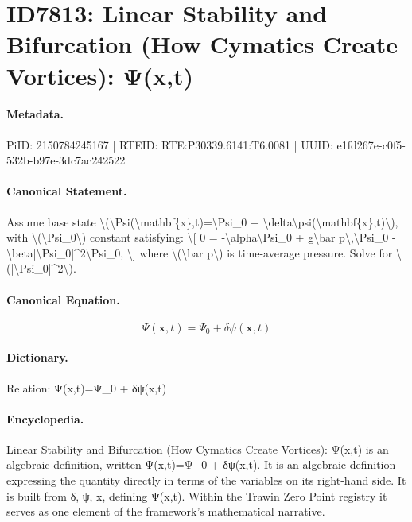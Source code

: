 \section*{ID7813: Linear Stability and Bifurcation (How Cymatics Create Vortices): Ψ(x,t)}
\paragraph{Metadata.}
PiID: 2150784245167 | RTEID: RTE:P30339.6141:T6.0081 | UUID: e1fd267e-c0f5-532b-b97e-3dc7ac242522

\paragraph{Canonical Statement.}
Assume base state \textbackslash{}(\textbackslash{}Psi(\textbackslash{}mathbf\{x\},t)=\textbackslash{}Psi\_0 + \textbackslash{}delta\textbackslash{}psi(\textbackslash{}mathbf\{x\},t)\textbackslash{}), with \textbackslash{}(\textbackslash{}Psi\_0\textbackslash{}) constant satisfying: \textbackslash{}[ 0 = -\textbackslash{}alpha\textbackslash{}Psi\_0 + g\textbackslash{}bar p\textbackslash{},\textbackslash{}Psi\_0 - \textbackslash{}beta|\textbackslash{}Psi\_0|\textasciicircum{}2\textbackslash{}Psi\_0, \textbackslash{}] where \textbackslash{}(\textbackslash{}bar p\textbackslash{}) is time-average pressure. Solve for \textbackslash{}(|\textbackslash{}Psi\_0|\textasciicircum{}2\textbackslash{}).

\paragraph{Canonical Equation.}
\[
\Psi(\mathbf{x},t)=\Psi_0 + \delta\psi(\mathbf{x},t)
\]

\paragraph{Dictionary.}
Relation: Ψ(x,t)=Ψ\_0 + δψ(x,t)

\paragraph{Encyclopedia.}
Linear Stability and Bifurcation (How Cymatics Create Vortices): Ψ(x,t) is an algebraic definition, written Ψ(x,t)=Ψ\_0 + δψ(x,t). It is an algebraic definition expressing the quantity directly in terms of the variables on its right-hand side. It is built from δ, ψ, x, defining Ψ(x,t). Within the Trawin Zero Point registry it serves as one element of the framework's mathematical narrative.
